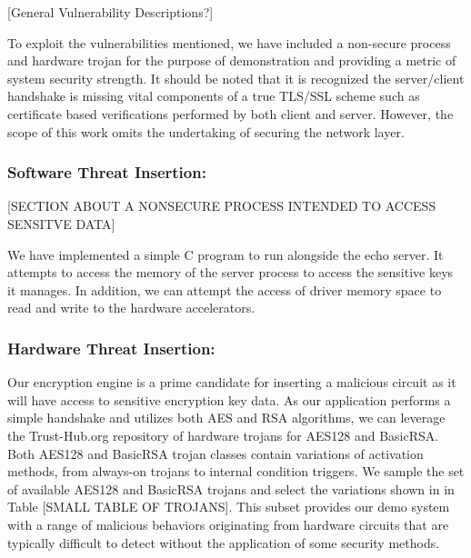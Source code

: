 \documentclass[sigconf]{acmart}
\theoremstyle{plain}
\theoremstyle{remark}
\begin{document}
[General Vulnerability Descriptions?]


To exploit the vulnerabilities mentioned, we have included a non-secure process and hardware trojan for the purpose of demonstration and providing a metric of system security strength. It should be noted that it is recognized the server/client handshake is missing vital components of a true TLS/SSL scheme such as certificate based verifications performed by both client and server. However, the scope of this work omits the undertaking of securing the network layer.

\subsubsection{Software Threat Insertion:}
[SECTION ABOUT A NONSECURE PROCESS INTENDED TO ACCESS SENSITVE DATA]

We have implemented a simple C program to run alongside the echo server. It attempts to access the memory of the server process to access the sensitive keys it manages. In addition, we can attempt the access of driver memory space to read and write to the hardware accelerators.


\subsubsection{Hardware Threat Insertion:}

Our encryption engine is a prime candidate for inserting a malicious circuit as it will have access to sensitive encryption key data. As our application performs a simple handshake and utilizes both AES and RSA algorithms, we can leverage the Trust-Hub.org repository of hardware trojans for AES128 and BasicRSA. Both AES128 and BasicRSA trojan classes contain variations of activation methods, from always-on trojans to internal condition triggers. We sample the set of available AES128 and BasicRSA trojans and select the variations shown in in Table [SMALL TABLE OF TROJANS]. This subset provides our demo system with a range of malicious behaviors originating from hardware circuits that are typically difficult to detect without the application of some security methods.
\end{document}
